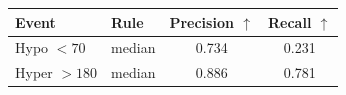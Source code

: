 \begin{tabular}{llcc}
\toprule
Event & Rule & Precision $\uparrow$ & Recall $\uparrow$ \\
\midrule
Hypo $<70$ & median & 0.734 & 0.231 \\
Hyper $>180$ & median & 0.886 & 0.781 \\
\bottomrule
\end{tabular}
